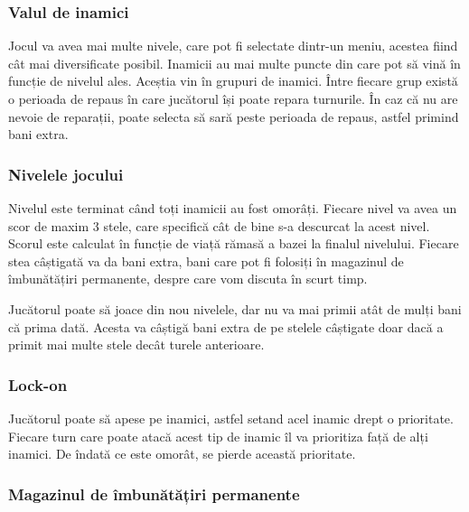 \documentclass[12pt, a4paper]{article}
\begin{document}
	
	
	
	
	\subsubsection{Valul de inamici}
	
	Jocul va avea mai multe nivele, care pot fi selectate dintr-un meniu, acestea fiind cât mai diversificate posibil. Inamicii au mai multe puncte din care pot să vină în funcție de nivelul ales. Aceștia vin în grupuri de inamici. Între fiecare grup există o perioada de repaus în care jucătorul își poate repara turnurile. În caz că nu are nevoie de reparații, poate selecta să sară peste perioada de repaus, astfel primind bani extra.
	
	
	
	
	
	\subsubsection{Nivelele jocului}
	
	Nivelul este terminat când toți inamicii au fost omorâți. Fiecare nivel va avea un scor de maxim 3 stele, care specifică cât de bine s-a descurcat la acest nivel. Scorul este calculat în funcție de viață rămasă a bazei la finalul nivelului. Fiecare stea câștigată va da bani extra, bani care pot fi folosiți în magazinul de îmbunătățiri permanente, despre care vom discuta în scurt timp.
	\newline
	
	Jucătorul poate să joace din nou nivelele, dar nu va mai primii atât de mulți bani că prima dată. Acesta va câștigă bani extra de pe stelele câștigate doar dacă a primit mai multe stele decât turele anterioare.
	
	
	
	
	
	\subsubsection{Lock-on}
	
	Jucătorul poate să apese pe inamici, astfel setand acel inamic drept o prioritate. Fiecare turn care poate atacă acest tip de inamic îl va prioritiza față de alți inamici. De îndată ce este omorât, se pierde această prioritate.
	
	
	
	
	
	\subsubsection{Magazinul de îmbunătățiri permanente}
	
\end{document}
